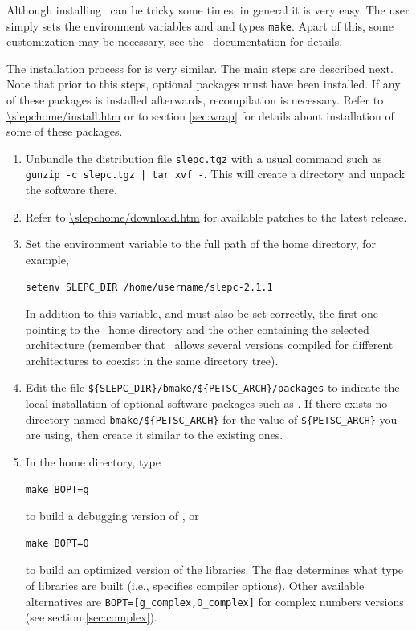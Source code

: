 	Although installing \petsc\ can be tricky some times, in general it is very easy. The user simply sets the environment variables  and  and types \texttt{make}. Apart of this, some customization may be necessary, see the \petsc\ documentation for details.

	The installation process for \slepc is very similar. The main steps are described next. Note that prior to this steps, optional packages must have been installed. If any of these packages is installed afterwards, recompilation is necessary. Refer to \url{\slepchome/install.htm} or to section \ref{sec:wrap} for details about installation of some of these packages.

\begin{enumerate}
	\item Unbundle the distribution file \Verb!slepc.tgz! with a usual command such as \Verb!gunzip -c slepc.tgz | tar xvf -!. This will create a directory and unpack the software there.
	\item Refer to \url{\slepchome/download.htm} for available patches to the latest \slepc release.
	\item Set the environment variable  to the full path of the \slepc home directory, for example,
	\begin{Verbatim}[fontsize=\small]
	setenv SLEPC_DIR /home/username/slepc-2.1.1
	\end{Verbatim}
	In addition to this variable,  and  must also be set correctly, the first one pointing to the \petsc\ home directory and the other containing the selected architecture (remember that \petsc\ allows several versions compiled for different architectures to coexist in the same directory tree).
	\item Edit the file \Verb!${SLEPC_DIR}/bmake/${PETSC_ARCH}/packages! to indicate the local installation of optional software packages such as \arpack. If there exists no directory named \Verb!bmake/${PETSC_ARCH}! for the value of \Verb!${PETSC_ARCH}! you are using, then create it similar to the existing ones.
	\item In the \slepc home directory, type
	\begin{Verbatim}[fontsize=\small]
	make BOPT=g
	\end{Verbatim}
      to build a debugging version of \slepc, or
	\begin{Verbatim}[fontsize=\small]
	make BOPT=O
	\end{Verbatim}
      to build an optimized version of the \slepc libraries. The flag  determines what type of libraries are built (i.e., specifies compiler options). Other available alternatives are \Verb!BOPT=[g_complex,O_complex]! for complex numbers versions (see section \ref{sec:complex}).

\end{enumerate}
